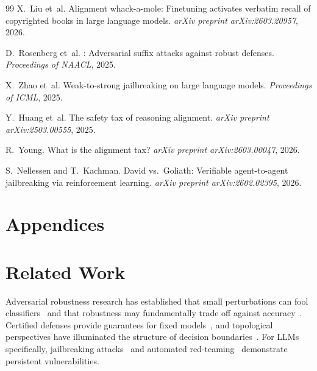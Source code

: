 \documentclass[11pt]{article}
\begin{document}
\begin{thebibliography}{99}
X.~Liu et~al.
\newblock Alignment whack-a-mole: Finetuning activates verbatim recall of
  copyrighted books in large language models.
\newblock \emph{arXiv preprint arXiv:2603.20957}, 2026.

D.~Rosenberg et~al.
: Adversarial suffix attacks against robust defenses.
\newblock \emph{Proceedings of NAACL}, 2025.

X.~Zhao et~al.
\newblock Weak-to-strong jailbreaking on large language models.
\newblock \emph{Proceedings of ICML}, 2025.

Y.~Huang et~al.
\newblock The safety tax of reasoning alignment.
\newblock \emph{arXiv preprint arXiv:2503.00555}, 2025.

R.~Young.
\newblock What is the alignment tax?
\newblock \emph{arXiv preprint arXiv:2603.00047}, 2026.

S.~Nellessen and T.~Kachman.
\newblock David vs.\ Goliath: Verifiable agent-to-agent jailbreaking
  via reinforcement learning.
\newblock \emph{arXiv preprint arXiv:2602.02395}, 2026.

\end{thebibliography}


\newpage
\appendix
\section*{Appendices}

\section{Related Work}
\label{app:related}

Adversarial robustness research has established that small
perturbations can fool classifiers~\cite{szegedy2013intriguing,
goodfellow2014explaining,carlini2017evaluating,madry2018towards} and
that robustness may fundamentally trade off against
accuracy~\cite{tsipras2018robustness,fawzi2018adversarial}. Certified
defenses provide guarantees for fixed
models~\cite{cohen2019certified,katz2017reluplex,singh2019abstract,
huang2017safety,bagnall2019certifying}, and topological perspectives
have illuminated the structure of decision
boundaries~\cite{naitzat2020topology}. For LLMs specifically,
jailbreaking attacks~\cite{zou2023universal,chao2024jailbreaking,
mehrotra2024tree,greshake2023indirect} and automated
red-teaming~\cite{mouret2015illuminating,samvelyan2024rainbow}
demonstrate persistent vulnerabilities.
\end{document}
